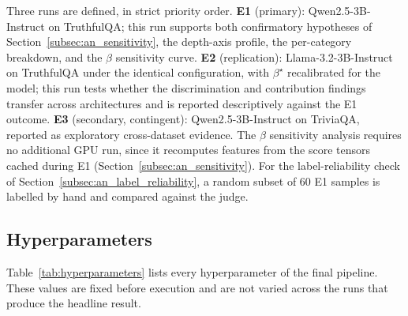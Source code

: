 Three runs are defined, in strict priority order. \textbf{E1} (primary):
Qwen2.5-3B-Instruct on TruthfulQA; this run supports both confirmatory
hypotheses of Section~\ref{subsec:an_sensitivity}, the depth-axis profile,
the per-category breakdown, and the $\beta$ sensitivity curve. \textbf{E2}
(replication): Llama-3.2-3B-Instruct on TruthfulQA under the identical
configuration, with $\beta^\star$ recalibrated for the model; this run
tests whether the discrimination and contribution findings transfer across
architectures and is reported descriptively against the E1 outcome.
\textbf{E3} (secondary, contingent): Qwen2.5-3B-Instruct on TriviaQA,
reported as exploratory cross-dataset evidence. The $\beta$ sensitivity
analysis requires no additional GPU run, since it recomputes features from
the score tensors cached during E1
(Section~\ref{subsec:an_sensitivity}). For the label-reliability check of
Section~\ref{subsec:an_label_reliability}, a random subset of $60$ E1
samples is labelled by hand and compared against the judge.

\subsection{Hyperparameters}
\label{subsec:hyperparameters}

Table~\ref{tab:hyperparameters} lists every hyperparameter of the final
pipeline. These values are fixed before execution and are not varied
across the runs that produce the headline result.

